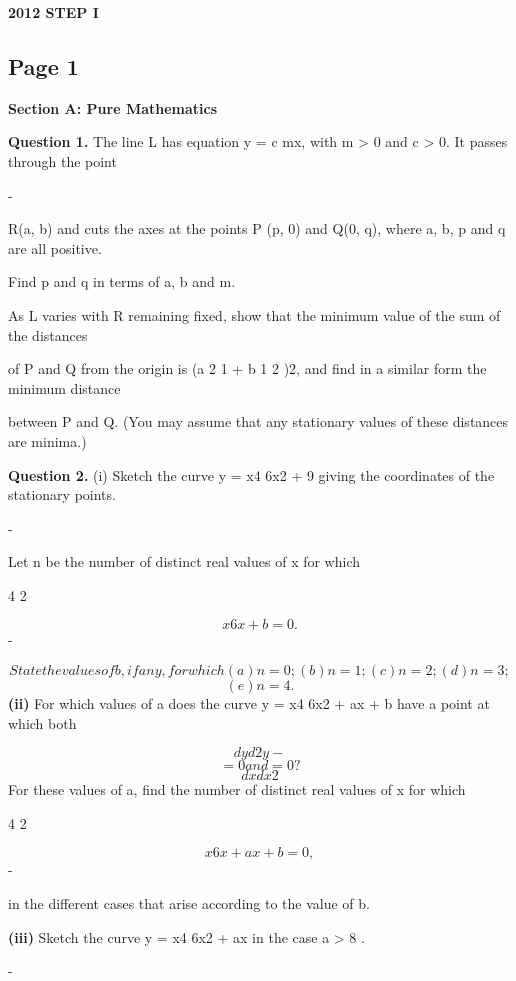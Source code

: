 \documentclass[12pt]{article}
\begin{document}
\begin{center}
{\Large \textbf{2012 STEP I}}
\end{center}

\subsection*{Page 1}
\begin{flushleft}
\phi\par
\bigskip\textbf{Section A: Pure Mathematics}\par
\bigskip\textbf{Question 1.} The line L has equation y = c mx, with m > 0 and c > 0. It passes through the point\par
-\par
R(a, b) and cuts the axes at the points P (p, 0) and Q(0, q), where a, b, p and q are all positive.\par
Find p and q in terms of a, b and m.\par
As L varies with R remaining fixed, show that the minimum value of the sum of the distances\par
of P and Q from the origin is (a 2 1 + b 1 2 )2, and find in a similar form the minimum distance\par
between P and Q. (You may assume that any stationary values of these distances are minima.)\par
\bigskip\textbf{Question 2.} (i) Sketch the curve y = x4 6x2 + 9 giving the coordinates of the stationary points.\par
-\par
Let n be the number of distinct real values of x for which\par
4 2\par
\[x 6x + b = 0.\]
-\par
\[State the values of b, if any, for which (a) n = 0 ; (b) n = 1 ; (c) n = 2 ; (d) n = 3 ;\]
\[(e) n = 4 .\]
\textbf{(ii)} For which values of a does the curve y = x4 6x2 + ax + b have a point at which both\par
\[dy d2y -\]
\[= 0 and = 0 ?\]
\[dx dx2\]
For these values of a, find the number of distinct real values of x for which\par
4 2\par
\[x 6x + ax + b = 0 ,\]
-\par
in the different cases that arise according to the value of b.\par
\textbf{(iii)} Sketch the curve y = x4 6x2 + ax in the case a > 8 .\par
-\par
\end{flushleft}
\end{document}
